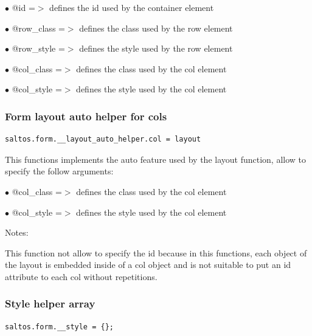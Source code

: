 \documentclass[a4paper]{article}
\begin{document}
\begin{compactitem}
\item[\color{myblue}$\bullet$] @id              =$>$ defines the id used by the container element
\item[\color{myblue}$\bullet$] @row\_class       =$>$ defines the class used by the row element
\item[\color{myblue}$\bullet$] @row\_style       =$>$ defines the style used by the row element
\item[\color{myblue}$\bullet$] @col\_class       =$>$ defines the class used by the col element
\item[\color{myblue}$\bullet$] @col\_style       =$>$ defines the style used by the col element
\end{compactitem}

\hypertarget{toc225}{}
\subsubsection{Form layout auto helper for cols}

\begin{lstlisting}
saltos.form.__layout_auto_helper.col = layout
\end{lstlisting}

This functions implements the auto feature used by the layout function, allow to specify the
follow arguments:

\begin{compactitem}
\item[\color{myblue}$\bullet$] @col\_class       =$>$ defines the class used by the col element
\item[\color{myblue}$\bullet$] @col\_style       =$>$ defines the style used by the col element
\end{compactitem}

Notes:

This function not allow to specify the id because in this functions, each object of the
layout is embedded inside of a col object and is not suitable to put an id attribute
to each col without repetitions.

\hypertarget{toc226}{}
\subsubsection{Style helper array}

\begin{lstlisting}
saltos.form.__style = {};
\end{lstlisting}
\end{document}
